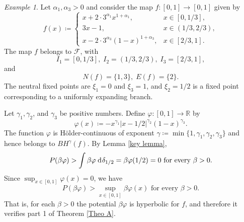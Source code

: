 \documentclass[12pt]{amsart}
\numberwithin{equation}{section} %
\numberwithin{figure}{section} %
\theoremstyle{plain}
\theoremstyle{definition}
\theoremstyle{remark}
\newtheorem{exam}[prop]{Example}
\theoremstyle{citing}
\newcommand{\R}{\mathbb{R}}
\renewcommand{\=}{\coloneqq}
\newcommand{\dd}{\hspace{1pt}\operatorname{d}\hspace{-1pt}}
\begin{document}
\begin{exam}
    Let $\alpha_1,\alpha_3>0$ and consider the map $f\colon[0,1]\to [0,1]$ given by
    \begin{equation}
        f(x) \= \begin{cases}
            x+ 2\cdot 3^{\alpha_1}x^{1+\alpha_1}, & x\in [0,1/3],\\[3pt]
            3x-1, & x\in(1/3,2/3),\\[3pt]
            x-2\cdot 3^{\alpha_3}(1-x)^{1+\alpha_3}, & x\in [2/3,1].
        \end{cases} 
    \end{equation}
    The map $f$ belongs to $\mathscr{F}$, with 
    \begin{equation*}
        I_1 = [0,1/3],\; I_2=(1/3,2/3),\; I_3 = [2/3,1],
    \end{equation*}
    and
    \begin{equation*}
        N(f) = \{1,3\},\; E(f)=\{2\}.
    \end{equation*}
     The neutral fixed points are $\xi_1=0$ and $\xi_3=1$, and $\xi_2=1/2$ is a fixed point corresponding to a uniformly expanding branch. 
     
     Let $\gamma_1,\gamma_2$, and $\gamma_3$ be positive numbers. Define $\varphi\colon[0,1]\to \R$ by 
    \begin{equation*}
        \varphi(x) \= -x^{\gamma_1}|x-1/2|^{\gamma_2}(1-x)^{\gamma_3}.
    \end{equation*}
   The function $\varphi$ is Hölder-continuous of exponent $\gamma\= \min\{1,\gamma_1,\gamma_2,\gamma_3\}$ and hence belongs to $BH^\gamma(f)$. By Lemma \ref{key lemma},
    \begin{equation*}
        P(\beta\varphi) > \int \beta\varphi \dd \delta_{1/2} = \beta\varphi(1/2)=0 \text{ for every }\beta>0.
    \end{equation*}
   Since $\sup_{x\in[0,1]}\varphi(x) =0$, we have
   \begin{equation*}
       P(\beta\varphi) > \sup_{x\in[0,1]} \beta \varphi(x) \text{ for every }\beta>0.
   \end{equation*}
   That is, for each $\beta>0$ the potential $\beta\varphi$ is hyperbolic for $f$, and therefore it verifies part 1 of Theorem \ref{Theo A}.
    

\end{exam}
\end{document}
